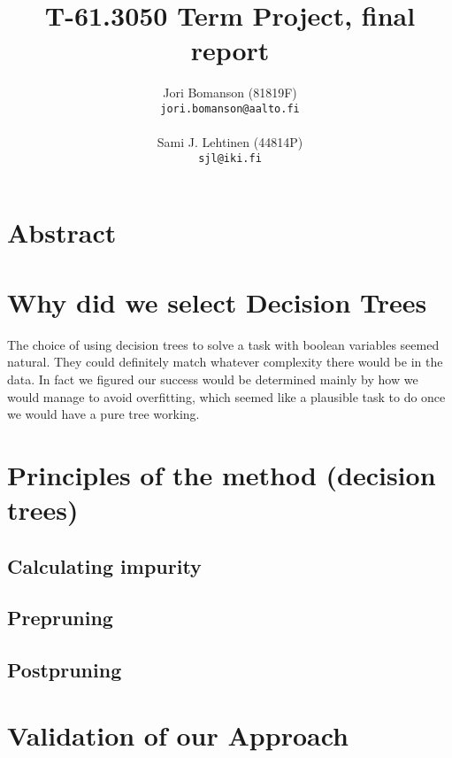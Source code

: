 \documentclass[a4paper,10pt]{article}
\title{T-61.3050 Term Project, final report} %
\author{Jori Bomanson (81819F) \\
  {\tt jori.bomanson@aalto.fi} \\
  \\
  Sami J. Lehtinen (44814P)\\ 
  {\tt sjl@iki.fi} \\
}
\begin{document}

\maketitle

\section*{Abstract}

\section*{}

\section*{Why did we select Decision Trees}

The choice of using decision trees to solve a task with boolean variables
seemed natural. They could definitely match whatever complexity there would
be in the data. %
In fact we figured our success would be determined mainly by how we would
manage to avoid overfitting, which seemed like a plausible task to do once
we would have a pure tree working.


\section*{Principles of the method (decision trees)}

\subsection*{Calculating impurity}

\subsection*{Prepruning}

\subsection*{Postpruning}

\section*{Validation of our Approach}
\end{document}
